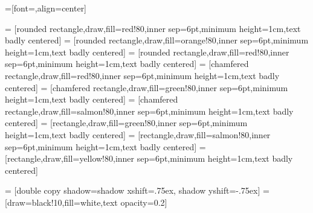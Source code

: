 

=[font=\sffamily,align=center]

\newcommand{\fillOpacity}{80}

\newcommand{\compShape}{rectangle}
\newcommand{\groupShape}{chamfered rectangle}
\newcommand{\procShape}{rounded rectangle}

\newcommand{\explicitColor}{green}
\newcommand{\implicitColor}{salmon}
\newcommand{\optimizationColor}{red} %

 = [\procShape,draw,fill=\optimizationColor!\fillOpacity,inner sep=6pt,minimum height=1cm,text badly centered]
 = [\procShape,draw,fill=orange!\fillOpacity,inner sep=6pt,minimum height=1cm,text badly centered]
 = [\procShape,draw,fill=\optimizationColor!\fillOpacity,inner sep=6pt,minimum height=1cm,text badly centered]
 = [\groupShape,draw,fill=\optimizationColor!\fillOpacity,inner sep=6pt,minimum height=1cm,text badly centered]
 = [\groupShape,draw,fill=\explicitColor!\fillOpacity,inner sep=6pt,minimum height=1cm,text badly centered]
 = [\groupShape,draw,fill=\implicitColor!\fillOpacity,inner sep=6pt,minimum height=1cm,text badly centered]
 = [\compShape,draw,fill=\explicitColor!\fillOpacity,inner sep=6pt,minimum height=1cm,text badly centered]
 = [\compShape,draw,fill=\implicitColor!\fillOpacity,inner sep=6pt,minimum height=1cm,text badly centered]
 = [\compShape,draw,fill=yellow!\fillOpacity,inner sep=6pt,minimum height=1cm,text badly centered]

 = [double copy shadow={shadow xshift=.75ex, shadow yshift=-.75ex}]
 = [draw=black!10,fill=white,text opacity=0.2]

